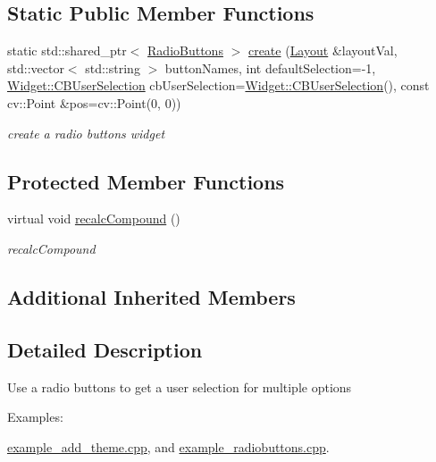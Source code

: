 \subsection*{Static Public Member Functions}
\begin{DoxyCompactItemize}
\item 
static std\+::shared\+\_\+ptr$<$ \hyperlink{classcanvascv_1_1RadioButtons}{Radio\+Buttons} $>$ \hyperlink{classcanvascv_1_1RadioButtons_a302902d397822611546929f214604183}{create} (\hyperlink{classcanvascv_1_1Layout}{Layout} \&layout\+Val, std\+::vector$<$ std\+::string $>$ button\+Names, int default\+Selection=-\/1, \hyperlink{classcanvascv_1_1Widget_a977cbd39cf203c5866f07f3645c7e4bc}{Widget\+::\+C\+B\+User\+Selection} cb\+User\+Selection=\hyperlink{classcanvascv_1_1Widget_a977cbd39cf203c5866f07f3645c7e4bc}{Widget\+::\+C\+B\+User\+Selection}(), const cv\+::\+Point \&pos=cv\+::\+Point(0, 0))
\begin{DoxyCompactList}\small\item\em create a radio buttons widget \end{DoxyCompactList}\end{DoxyCompactItemize}
\subsection*{Protected Member Functions}
\begin{DoxyCompactItemize}
\item 
virtual void \hyperlink{classcanvascv_1_1RadioButtons_af4f863f492ca723a0ddac03139a1f187}{recalc\+Compound} ()
\begin{DoxyCompactList}\small\item\em recalc\+Compound \end{DoxyCompactList}\end{DoxyCompactItemize}
\subsection*{Additional Inherited Members}


\subsection{Detailed Description}
Use a radio buttons to get a user selection for multiple options \begin{Desc}
\item[Examples\+: ]\par
\hyperlink{example_add_theme_8cpp-example}{example\+\_\+add\+\_\+theme.\+cpp}, and \hyperlink{example_radiobuttons_8cpp-example}{example\+\_\+radiobuttons.\+cpp}.\end{Desc}


